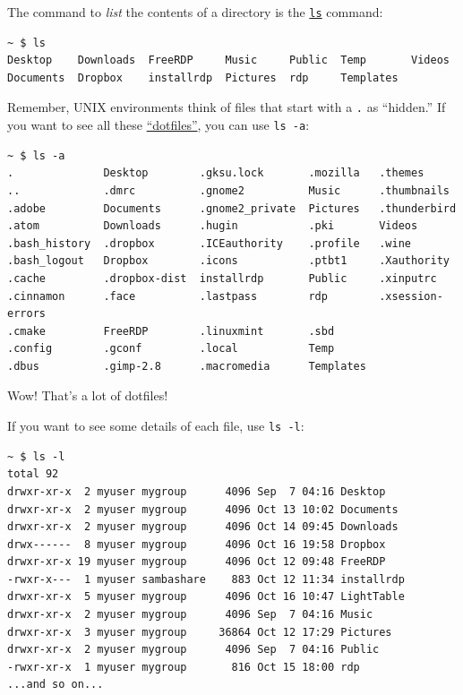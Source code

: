 \documentclass[10pt,]{book}
\numberwithin{figure}{chapter}
\begin{document}
The command to \emph{list} the contents of a directory is the
\href{http://linux.die.net/man/1/ls}{\texttt{ls}} command:

\begin{verbatim}
~ $ ls
Desktop    Downloads  FreeRDP     Music     Public  Temp       Videos
Documents  Dropbox    installrdp  Pictures  rdp     Templates
\end{verbatim}

Remember, UNIX environments think of files that start with a \texttt{.}
as ``hidden.'' If you want to see all these
\href{https://en.wikipedia.org/wiki/Hidden_file_and_hidden_directory\#Unix_and_Unix-like_environments}{``dotfiles''},
you can use \texttt{ls -a}:

\begin{verbatim}
~ $ ls -a
.              Desktop        .gksu.lock       .mozilla   .themes
..             .dmrc          .gnome2          Music      .thumbnails
.adobe         Documents      .gnome2_private  Pictures   .thunderbird
.atom          Downloads      .hugin           .pki       Videos
.bash_history  .dropbox       .ICEauthority    .profile   .wine
.bash_logout   Dropbox        .icons           .ptbt1     .Xauthority
.cache         .dropbox-dist  installrdp       Public     .xinputrc
.cinnamon      .face          .lastpass        rdp        .xsession-errors
.cmake         FreeRDP        .linuxmint       .sbd
.config        .gconf         .local           Temp
.dbus          .gimp-2.8      .macromedia      Templates
\end{verbatim}

Wow! That's a lot of dotfiles!

If you want to see some details of each file, use \texttt{ls -l}:

\begin{verbatim}
~ $ ls -l
total 92
drwxr-xr-x  2 myuser mygroup      4096 Sep  7 04:16 Desktop
drwxr-xr-x  2 myuser mygroup      4096 Oct 13 10:02 Documents
drwxr-xr-x  2 myuser mygroup      4096 Oct 14 09:45 Downloads
drwx------  8 myuser mygroup      4096 Oct 16 19:58 Dropbox
drwxr-xr-x 19 myuser mygroup      4096 Oct 12 09:48 FreeRDP
-rwxr-x---  1 myuser sambashare    883 Oct 12 11:34 installrdp
drwxr-xr-x  5 myuser mygroup      4096 Oct 16 10:47 LightTable
drwxr-xr-x  2 myuser mygroup      4096 Sep  7 04:16 Music
drwxr-xr-x  3 myuser mygroup     36864 Oct 12 17:29 Pictures
drwxr-xr-x  2 myuser mygroup      4096 Sep  7 04:16 Public
-rwxr-xr-x  1 myuser mygroup       816 Oct 15 18:00 rdp
...and so on...
\end{verbatim}
\end{document}
